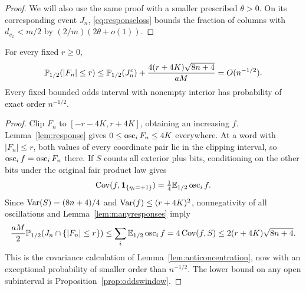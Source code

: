 \begin{proof}
We will also use the same proof with a smaller prescribed $\theta>0$. On its corresponding event $J_n$, \eqref{eq:responseloss} bounds the fraction of columns with $d_{v_x}<m/2$ by $(2/m)(2\theta+o(1))$.
\end{proof}

\begin{lemma}\label{lem:sharpodds}
For every fixed $r\ge0$,
\begin{equation}\label{eq:sharpodds}
 \mathbb P_{1/2}(|F_n|\le r)
 \le\mathbb P_{1/2}(J_n^c)+\frac{4(r+4K)\sqrt{8n+4}}{aM}
 =O(n^{-1/2}).
\end{equation}
Every fixed bounded odds interval with nonempty interior has probability of exact order $n^{-1/2}$.
\end{lemma}
\begin{proof}
Clip $F_n$ to $[-r-4K,r+4K]$, obtaining an increasing $f$. Lemma~\ref{lem:response} gives $0\le\operatorname{osc}_iF_n\le4K$ everywhere. At a word with $|F_n|\le r$, both values of every coordinate pair lie in the clipping interval, so $\operatorname{osc}_if=\operatorname{osc}_iF_n$ there. If $S$ counts all exterior plus bits, conditioning on the other bits under the original fair product law gives
\[
 \operatorname{Cov}(f,\mathbf 1_{\{\eta_i=+1\}})=\tfrac14\mathbb E_{1/2}\operatorname{osc}_if.
\]
Since $\operatorname{Var}(S)=(8n+4)/4$ and $\operatorname{Var}(f)\le(r+4K)^2$, nonnegativity of all oscillations and Lemma~\ref{lem:manyresponses} imply
\[
 \frac{aM}{2}\mathbb P_{1/2}(J_n\cap\{|F_n|\le r\})
 \le\sum_i\mathbb E_{1/2}\operatorname{osc}_if
 =4\operatorname{Cov}(f,S)\le2(r+4K)\sqrt{8n+4}.
\]
This is the covariance calculation of Lemma~\ref{lem:anticoncentration}, now with an exceptional probability of smaller order than $n^{-1/2}$. The lower bound on any open subinterval is Proposition~\ref{prop:oddswindow}.
\end{proof}

